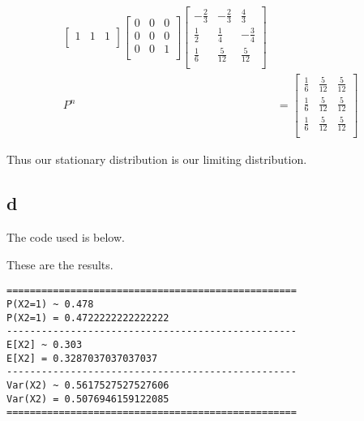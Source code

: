 \documentclass{article}
\begin{document}
\begin{align*}
\begin{bmatrix}
                  1 &  1 & 1 \\
    \end{bmatrix}
    \begin{bmatrix}
        0 & 0 & 0 \\
        0 & 0 & 0 \\
        0 & 0 & 1 \\
    \end{bmatrix}
    \begin{bmatrix}
        -\frac{2}{3} & -\frac{2}{3} & \frac{4}{3} \\
         \frac{1}{2} &  \frac{1}{4} & -\frac{3}{4} \\
         \frac{1}{6} & \frac{5}{12} & \frac{5}{12} \\
    \end{bmatrix} \\
    P^n
    &=
    \begin{bmatrix}
        \frac{1}{6} & \frac{5}{12} & \frac{5}{12} \\
        \frac{1}{6} & \frac{5}{12} & \frac{5}{12} \\
        \frac{1}{6} & \frac{5}{12} & \frac{5}{12} \\
    \end{bmatrix}
\end{align*}

Thus our stationary distribution is our limiting distribution.

\subsection{d}
The code used is below.


These are the results.
\begin{verbatim}
==================================================
P(X2=1) ~ 0.478
P(X2=1) = 0.4722222222222222
--------------------------------------------------
E[X2] ~ 0.303
E[X2] = 0.3287037037037037
--------------------------------------------------
Var(X2) ~ 0.5617527527527606
Var(X2) = 0.5076946159122085
==================================================
\end{verbatim}

\end{document}
